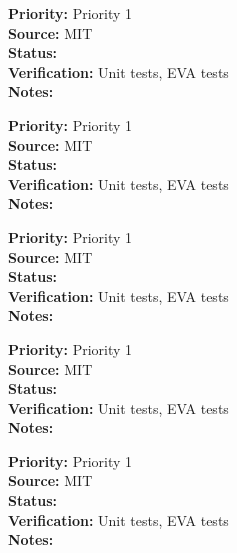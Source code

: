\begin{reqlist}
{\bf Priority:} Priority 1 \\
{\bf Source:}  MIT \\
{\bf Status:}  \\
{\bf Verification:} Unit tests, EVA tests \\
{\bf Notes:}
\end{reqlist}

\begin{reqlist}
{\bf Priority:} Priority 1 \\
{\bf Source:}  MIT \\
{\bf Status:}  \\
{\bf Verification:} Unit tests, EVA tests \\
{\bf Notes:}
\end{reqlist}

\begin{reqlist}
{\bf Priority:} Priority 1 \\
{\bf Source:}  MIT \\
{\bf Status:}  \\
{\bf Verification:} Unit tests, EVA tests \\
{\bf Notes:}
\end{reqlist}

\begin{reqlist}
{\bf Priority:} Priority 1 \\
{\bf Source:}  MIT \\
{\bf Status:}  \\
{\bf Verification:} Unit tests, EVA tests \\
{\bf Notes:}
\end{reqlist}

\begin{reqlist}
{\bf Priority:} Priority 1 \\
{\bf Source:}  MIT \\
{\bf Status:}  \\
{\bf Verification:} Unit tests, EVA tests \\
{\bf Notes:}
\end{reqlist}

